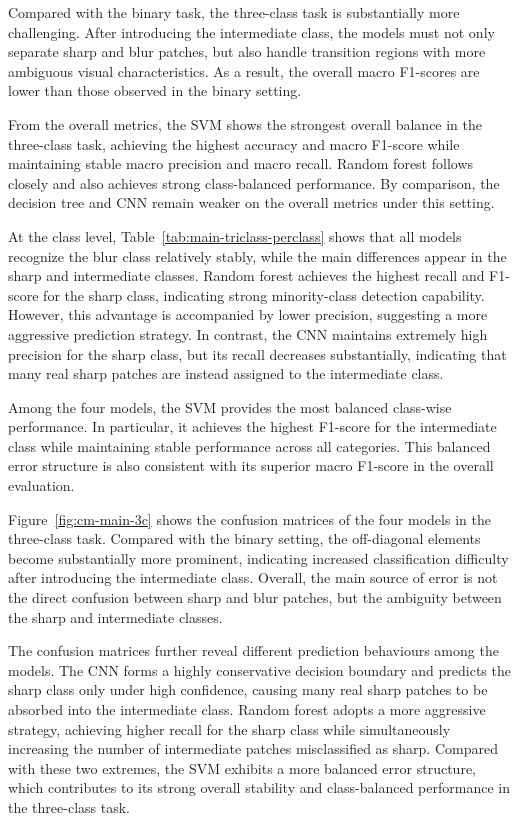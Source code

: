 \par Compared with the binary task, the three-class task is substantially more
challenging. After introducing the intermediate class, the models must not
only separate sharp and blur patches, but also handle transition regions with
more ambiguous visual characteristics. As a result, the overall macro
F1-scores are lower than those observed in the binary setting.

\par From the overall metrics, the SVM shows the strongest overall balance in
the three-class task, achieving the highest accuracy and macro F1-score while
maintaining stable macro precision and macro recall. Random forest follows
closely and also achieves strong class-balanced performance. By comparison, the
decision tree and CNN remain weaker on the overall metrics under this setting.

\par At the class level, Table~\ref{tab:main-triclass-perclass} shows that all
models recognize the blur class relatively stably, while the main differences
appear in the sharp and intermediate classes. Random forest achieves the
highest recall and F1-score for the sharp class, indicating strong
minority-class detection capability. However, this advantage is accompanied by
lower precision, suggesting a more aggressive prediction strategy. In contrast,
the CNN maintains extremely high precision for the sharp class, but its recall
decreases substantially, indicating that many real sharp patches are instead
assigned to the intermediate class.

\par Among the four models, the SVM provides the most balanced class-wise
performance. In particular, it achieves the highest F1-score for the
intermediate class while maintaining stable performance across all categories.
This balanced error structure is also consistent with its superior macro
F1-score in the overall evaluation.

\par Figure~\ref{fig:cm-main-3c} shows the confusion matrices of the four
models in the three-class task. Compared with the binary setting, the
off-diagonal elements become substantially more prominent, indicating increased
classification difficulty after introducing the intermediate class. Overall,
the main source of error is not the direct confusion between sharp and blur
patches, but the ambiguity between the sharp and intermediate classes.

\par The confusion matrices further reveal different prediction behaviours
among the models. The CNN forms a highly conservative decision boundary and
predicts the sharp class only under high confidence, causing many real sharp
patches to be absorbed into the intermediate class. Random forest adopts a
more aggressive strategy, achieving higher recall for the sharp class while
simultaneously increasing the number of intermediate patches misclassified as
sharp. Compared with these two extremes, the SVM exhibits a more balanced
error structure, which contributes to its strong overall stability and
class-balanced performance in the three-class task.

